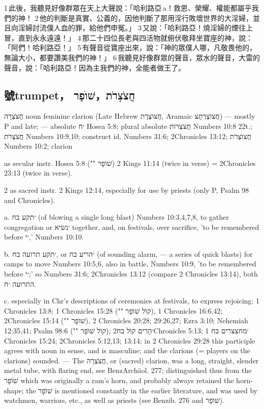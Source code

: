 1 此後，我聽見好像群眾在天上大聲說：「哈利路亞 a！救恩、榮耀、權能都屬乎我們的神！ 2 他的判斷是真實、公義的，因他判斷了那用淫行敗壞世界的大淫婦，並且向淫婦討流僕人血的罪，給他們申冤。」 3 又說：「哈利路亞！燒淫婦的煙往上冒，直到永永遠遠！」 4 那二十四位長老與四活物就俯伏敬拜坐寶座的神，說：「阿們！哈利路亞！」 5 有聲音從寶座出來，說：「神的眾僕人哪，凡敬畏他的，無論大小，都要讚美我們的神！」 6 我聽見好像群眾的聲音，眾水的聲音，大雷的聲音，說：「哈利路亞！因為主我們的神，全能者做王了。





  
\subsection{號trumpet， חֲצֹצְרֹת，שׁוֺפָר}
חֲצֹצְרָה noun feminine clarion (Late Hebrew חֲצוֺצֶרֶת, Aramaic חֲצוֺצַרְתָּצ) — mostly P and late; — absolute ׳ח Hosea 5:8; plural absolute חֲצֹצְרוֺת Numbers 10:8 22t.; חֲצֹצְרֹת Numbers 10:9,10; construct id. Numbers 31:6; 2Chronicles 13:12; חֲצוֺצְרֹת Numbers 10:2; clarion


as secular instr. Hosea 5:8 ("" שׁוֺפָר) 2 Kings 11:14 (twice in verse) = 2Chronicles 23:13 (twice in verse).

2 as sacred instr. 2 Kings 12:14, especially for use by priests (only P, Psalm 98 and Chronicles).

a. ׳תקע בח (of blowing a single long blast) Numbers 10:3,4,7,8, to gather congregation or ׳נשׂיא together, and, on festivals, over sacrifice, 'to be remembered before ׳י,' Numbers 10:10.

b. ׳תקע תרועה בח, or ׳הריע בח (of sounding alarm, — a series of quick blasts) for camps to move Numbers 10:5,6, also in battle, Numbers 10:9, 'to be remembered before ׳י;' so Numbers 31:6; 2Chronicles 13:12 (compare 2 Chronicles 13:14), both התרועה ׳ח.

c. especially in Chr's descriptions of ceremonies at festivals, to express rejoicing: 1 Chronicles 13:8; 1 Chronicles 15:28 ("" קוֺל שׁוֺפָר), 1 Chronicles 16:6,42; 2Chronicles 15:14 ("" שׁוֺפָר), 2 Chronicles 20:28; 29:26,27; Ezra 3:10; Nehemiah 12:35,41; Psalm 98:6 ("" קוֺל שׁוֺפָר); ׳הָרִים קוֺל בח2Chronicles 5:13; ׳מחצצרים בח 1 Chronicles 15:24; 2Chronicles 5:12,13; 13:14; in 2 Chronicles 29:28 this participle agrees with noun in sense, and is masculine; and the clarions (= players on the clarions) sounded. — The חֲצֹצְרָה, or (sacred) clarion, was a long, straight, slender metal tube, with flaring end, see BenzArchäol. 277; distinguished thus from the שׁוֺפָר which was originally a ram's horn, and probably always retained the horn-shape; the שׁוֺפָר is mentioned constantly in the earlier literature, and was used by watchmen, warriors, etc., as well as priests (see Benzib. 276 and שׁוֺפָר).

